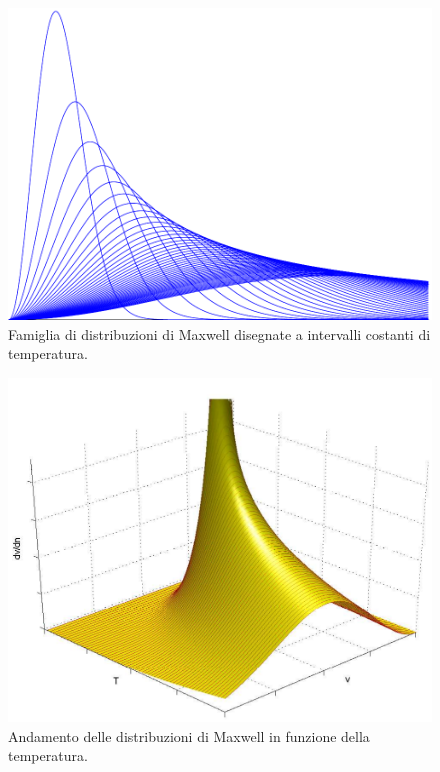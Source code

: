 \begin{figure}[htbp]
   \centering
   \includegraphics[scale=0.7]{immagini/fisica1/maxwell_famiglia2}
   \caption{Famiglia di distribuzioni di Maxwell disegnate a intervalli costanti di temperatura.}
\end{figure}

\begin{figure}[htbp]
   \centering
   \includegraphics[scale=0.8]{immagini/fisica1/maxwell3d}
   \caption{Andamento delle distribuzioni di Maxwell in funzione della temperatura.}
\end{figure}

